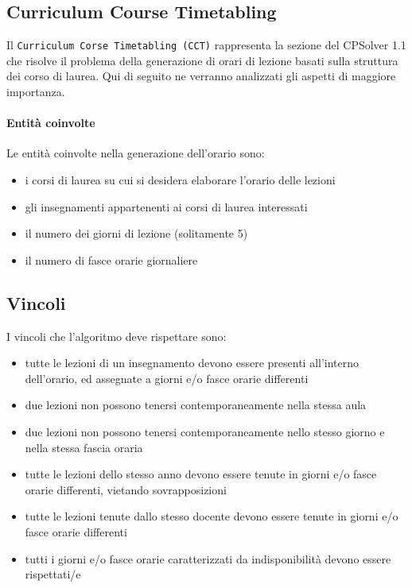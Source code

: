 \documentclass[11pt,a4paper]{article}
\begin{document}
\subsection*{Curriculum Course Timetabling}
Il \verb|Curriculum Corse Timetabling (CCT)| rappresenta la sezione del CPSolver 1.1 che risolve il problema della generazione di orari di lezione basati sulla struttura dei corso di laurea. Qui di seguito ne verranno analizzati gli aspetti di maggiore importanza.
\paragraph{Entità coinvolte}
Le entità coinvolte  nella generazione dell'orario sono:
\begin{itemize}
 \item i corsi di laurea su cui si desidera elaborare l'orario delle lezioni
 \item gli insegnamenti appartenenti ai corsi di laurea interessati
 \item il numero dei giorni di lezione (solitamente 5)
 \item il numero di fasce orarie giornaliere
\end{itemize}
\subsection*{Vincoli}
I vincoli che l'algoritmo deve rispettare sono:
\begin{itemize}
 \item tutte le lezioni di un insegnamento devono essere presenti all'interno dell'orario, ed assegnate a giorni e/o fasce orarie differenti
 \item due lezioni non possono tenersi contemporaneamente nella stessa aula
 \item due lezioni non possono tenersi contemporaneamente nello stesso giorno e nella stessa fascia oraria
 \item tutte le lezioni dello stesso anno devono essere tenute in giorni e/o fasce orarie differenti, vietando sovrapposizioni
 \item tutte le lezioni tenute dallo stesso docente devono essere tenute in giorni e/o fasce orarie differenti
 \item tutti i giorni e/o fasce orarie caratterizzati da indisponibilità devono essere rispettati/e
\end{itemize}
\end{document}
